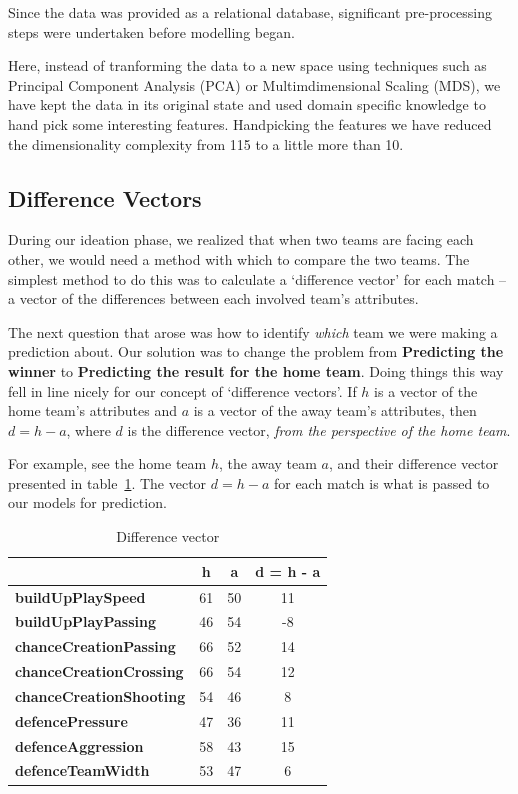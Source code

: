 \documentclass[11pt]{article}
\begin{document}
Since the data was provided as a relational database, significant pre-processing steps were undertaken before modelling began.

Here, instead of tranforming the data to a new space using techniques such as Principal Component Analysis (PCA) or Multimdimensional Scaling (MDS), we have kept the data in its original state and used domain specific knowledge to hand pick some interesting features.
Handpicking the features we have reduced the dimensionality complexity from 115 to a little more than 10.

\subsection{Difference Vectors}
During our ideation phase, we realized that when two teams are facing each other, we would need a method with which to compare the two teams.
The simplest method to do this was to calculate a `difference vector' for each match -- a vector of the differences between each involved team's attributes.

The next question that arose was how to identify \textit{which} team we were making a prediction about.
Our solution was to change the problem from \textbf{Predicting the winner} to \textbf{Predicting the result for the home team}.
Doing things this way fell in line nicely for our concept of `difference vectors'.
If $h$ is a vector of the home team's attributes and $a$ is a vector of the away team's attributes, then $d = h - a$, where $d$ is the difference vector, \textit{from the perspective of the home team}.

For example, see the home team $h$, the away team $a$, and their difference vector presented in table~\ref{tab:diff}.
The vector $d = h - a$ for each match is what is passed to our models for prediction.

\begin{table}[ht]
\centering
\begin{tabular}{|l|c|c|c|}
\hline
                                & \textbf{h} & \textbf{a} & \textbf{d = h - a} \\ \hline
\textbf{buildUpPlaySpeed}       & 61         & 50         & 11             \\ \hline
\textbf{buildUpPlayPassing}     & 46         & 54         & -8             \\ \hline
\textbf{chanceCreationPassing}  & 66         & 52         & 14             \\ \hline
\textbf{chanceCreationCrossing} & 66         & 54         & 12             \\ \hline
\textbf{chanceCreationShooting} & 54         & 46         & 8              \\ \hline
\textbf{defencePressure}        & 47         & 36         & 11             \\ \hline
\textbf{defenceAggression}      & 58         & 43         & 15             \\ \hline
\textbf{defenceTeamWidth}       & 53         & 47         & 6              \\ \hline
\end{tabular}
\caption{Difference vector}
\label{tab:diff}
\end{table}
\end{document}
